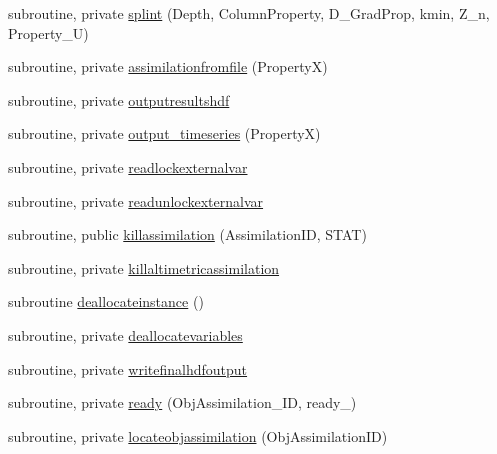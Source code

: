 \begin{DoxyCompactItemize}
subroutine, private \mbox{\hyperlink{namespacemoduleassimilation_a5db3c59220db22267e7e1e7eca84a356}{splint}} (Depth, Column\+Property, D\+\_\+\+Grad\+Prop, kmin, Z\+\_\+n, Property\+\_\+U)
\item 
subroutine, private \mbox{\hyperlink{namespacemoduleassimilation_ac07092b01bbf318f77800bb88c9f12bf}{assimilationfromfile}} (PropertyX)
\item 
subroutine, private \mbox{\hyperlink{namespacemoduleassimilation_a48b30161fd16a556f8e54eeaf6b054e3}{outputresultshdf}}
\item 
subroutine, private \mbox{\hyperlink{namespacemoduleassimilation_a4802b71b408a488941f1becab34042ec}{output\+\_\+timeseries}} (PropertyX)
\item 
subroutine, private \mbox{\hyperlink{namespacemoduleassimilation_ad7f96fa745bdccdc0281d15675836a9b}{readlockexternalvar}}
\item 
subroutine, private \mbox{\hyperlink{namespacemoduleassimilation_a3215402dbc1d7602c94ca05f33ce52a7}{readunlockexternalvar}}
\item 
subroutine, public \mbox{\hyperlink{namespacemoduleassimilation_a3e8d98d577185433d513756aadd846f8}{killassimilation}} (Assimilation\+ID, S\+T\+AT)
\item 
subroutine, private \mbox{\hyperlink{namespacemoduleassimilation_a457aa90cd01b96e0e4a625d41ea9ba78}{killaltimetricassimilation}}
\item 
subroutine \mbox{\hyperlink{namespacemoduleassimilation_a90d72337a9f9a14b03745d53d1bb201f}{deallocateinstance}} ()
\item 
subroutine, private \mbox{\hyperlink{namespacemoduleassimilation_a92631d1b5885e157d6d4ef36379213e9}{deallocatevariables}}
\item 
subroutine, private \mbox{\hyperlink{namespacemoduleassimilation_a68cb52758df87c362f43dd3e9690121b}{writefinalhdfoutput}}
\item 
subroutine, private \mbox{\hyperlink{namespacemoduleassimilation_a7c7eb17646a26837c5dfb9acc963b010}{ready}} (Obj\+Assimilation\+\_\+\+ID, ready\+\_\+)
\item 
subroutine, private \mbox{\hyperlink{namespacemoduleassimilation_acb3e0bb143f8372bac2b99052ba4943d}{locateobjassimilation}} (Obj\+Assimilation\+ID)
\end{DoxyCompactItemize}
